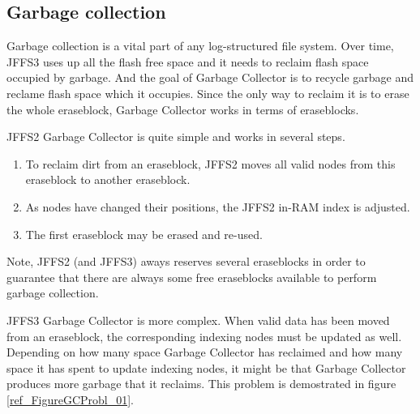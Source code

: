 %
%
\subsection{Garbage collection}

Garbage collection is a vital part of any \mbox{log-structured} file system.
Over time, JFFS3 uses up all the flash free space and it needs to reclaim flash
space occupied by garbage. And the goal of Garbage Collector is to recycle
garbage and reclame flash space which it occupies. Since the only way to
reclaim it is to erase the whole eraseblock, Garbage Collector works in terms
of eraseblocks.

JFFS2 Garbage Collector is quite simple and works in several steps.

\begin{enumerate}

\item To reclaim dirt from an eraseblock, JFFS2 moves all valid nodes from this
eraseblock to another eraseblock.

\item As nodes have changed their positions, the JFFS2 \mbox{in-RAM} index is
adjusted.

\item The first eraseblock may be erased and \mbox{re-used}.

\end{enumerate}

Note, JFFS2 (and JFFS3) aways reserves several eraseblocks in order to
guarantee that there are always some free eraseblocks available to perform
garbage collection.

JFFS3 Garbage Collector is more complex. When valid data has been moved from an
eraseblock, the corresponding indexing nodes must be updated as well. Depending
on how many space Garbage Collector has reclaimed and how many space it has
spent to update indexing nodes, it might be that Garbage Collector produces
more garbage that it reclaims. This problem is demostrated in figure
\ref{ref_FigureGCProbl_01}.

